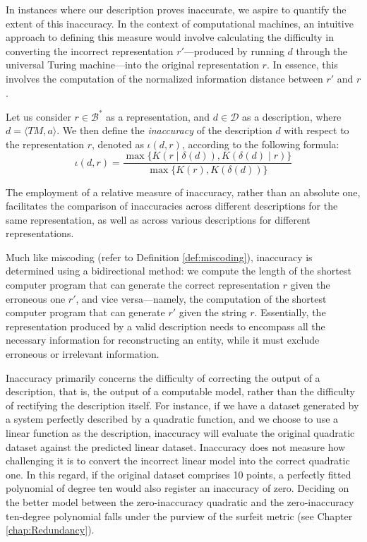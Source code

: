 In instances where our description proves inaccurate, we aspire to quantify the extent of this inaccuracy. In the context of computational machines, an intuitive approach to defining this measure would involve calculating the difficulty in converting the incorrect representation $r'$—produced by running $d$ through the universal Turing machine—into the original representation $r$. In essence, this involves the computation of the normalized information distance between $r'$ and $r$.

\begin{definition} [Inaccuracy]
\label{def:inaccuracy:inaccuracy:inaccuracy}
Let us consider $r \in \mathcal{B}^\ast$ as a representation, and $d \in \mathcal{D}$ as a description, where $d = \langle TM, a \rangle$. We then define the \emph{inaccuracy} of the description $d$ with respect to the representation $r$, denoted as $\iota(d, r)$, according to the following formula:
\[
\iota(d, r) = \frac{ \max\{ K \left(r \mid \delta(d) \right), K \left( \delta(d) \mid r \right) \} } { \max\{ K(r), K \left(\delta(d) \right) \} }
\]
\end{definition}

The employment of a relative measure of inaccuracy, rather than an absolute one, facilitates the comparison of inaccuracies across different descriptions for the same representation, as well as across various descriptions for different representations.

Much like miscoding (refer to Definition \ref{def:miscoding}), inaccuracy is determined using a bidirectional method: we compute the length of the shortest computer program that can generate the correct representation $r$ given the erroneous one $r'$, and vice versa—namely, the computation of the shortest computer program that can generate $r'$ given the string $r$. Essentially, the representation produced by a valid description needs to encompass all the necessary information for reconstructing an entity, while it must exclude erroneous or irrelevant information. 

\begin{example}
Inaccuracy primarily concerns the difficulty of correcting the output of a description, that is, the output of a computable model, rather than the difficulty of rectifying the description itself. For instance, if we have a dataset generated by a system perfectly described by a quadratic function, and we choose to use a linear function as the description, inaccuracy will evaluate the original quadratic dataset against the predicted linear dataset. Inaccuracy does not measure how challenging it is to convert the incorrect linear model into the correct quadratic one. In this regard, if the original dataset comprises 10 points, a perfectly fitted polynomial of degree ten would also register an inaccuracy of zero. Deciding on the better model between the zero-inaccuracy quadratic and the zero-inaccuracy ten-degree polynomial falls under the purview of the surfeit metric (see Chapter \ref{chap:Redundancy}).
\end{example}

